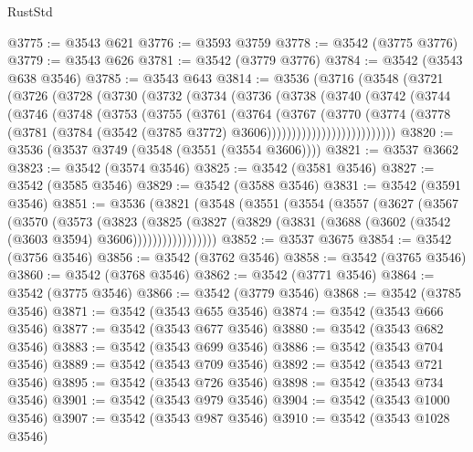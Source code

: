 \begin{lexlean}{RustStd}
\begin{coremodule}
{\begin{coremodule}
{{{{{{{{{{{{{{{{{{{{{{{{{{{{{{{{{{{{{{{{{{{{{{{{{{@3775 := @3543 @621
@3776 := @3593 @3759
@3778 := @3542 (@3775 @3776)
@3779 := @3543 @626
@3781 := @3542 (@3779 @3776)
@3784 := @3542 (@3543 @638 @3546)
@3785 := @3543 @643
@3814 := @3536
    (@3716
      (@3548
        (@3721
          (@3726
            (@3728
              (@3730
                (@3732
                  (@3734
                    (@3736
                      (@3738
                        (@3740
                          (@3742
                            (@3744
                              (@3746
                                (@3748
                                  (@3753
                                    (@3755
                                      (@3761
                                        (@3764
                                          (@3767
                                            (@3770
                                              (@3774
                                                (@3778
                                                  (@3781
                                                    (@3784
                                                      (@3542
                                                        (@3785 @3772)
                                                        @3606))))))))))))))))))))))))))
@3820 := @3536 (@3537 @3749 (@3548 (@3551 (@3554 @3606))))
@3821 := @3537 @3662
@3823 := @3542 (@3574 @3546)
@3825 := @3542 (@3581 @3546)
@3827 := @3542 (@3585 @3546)
@3829 := @3542 (@3588 @3546)
@3831 := @3542 (@3591 @3546)
@3851 := @3536
    (@3821
      (@3548
        (@3551
          (@3554
            (@3557
              (@3627
                (@3567
                  (@3570
                    (@3573
                      (@3823
                        (@3825
                          (@3827
                            (@3829 (@3831 (@3688 (@3602 (@3542 (@3603 @3594) @3606)))))))))))))))))
@3852 := @3537 @3675
@3854 := @3542 (@3756 @3546)
@3856 := @3542 (@3762 @3546)
@3858 := @3542 (@3765 @3546)
@3860 := @3542 (@3768 @3546)
@3862 := @3542 (@3771 @3546)
@3864 := @3542 (@3775 @3546)
@3866 := @3542 (@3779 @3546)
@3868 := @3542 (@3785 @3546)
@3871 := @3542 (@3543 @655 @3546)
@3874 := @3542 (@3543 @666 @3546)
@3877 := @3542 (@3543 @677 @3546)
@3880 := @3542 (@3543 @682 @3546)
@3883 := @3542 (@3543 @699 @3546)
@3886 := @3542 (@3543 @704 @3546)
@3889 := @3542 (@3543 @709 @3546)
@3892 := @3542 (@3543 @721 @3546)
@3895 := @3542 (@3543 @726 @3546)
@3898 := @3542 (@3543 @734 @3546)
@3901 := @3542 (@3543 @979 @3546)
@3904 := @3542 (@3543 @1000 @3546)
@3907 := @3542 (@3543 @987 @3546)
@3910 := @3542 (@3543 @1028 @3546)
}}}}}}}}}}}}}}}}}}}}}}}}}}}}}}}}}}}}}}}}}}}}}}}}}}
\end{coremodule}}
\end{coremodule}
\end{lexlean}
